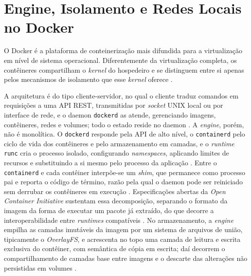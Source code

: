 
\section{Engine, Isolamento e Redes Locais no Docker}

O Docker é a plataforma de conteinerização mais difundida para a virtualização em nível de sistema operacional. Diferentemente da virtualização completa, os contêineres compartilham o \emph{kernel} do hospedeiro e se distinguem entre si apenas pelos mecanismos de isolamento que esse \emph{kernel} oferece \cite{souppaya2017nist}.

A arquitetura é do tipo cliente-servidor, no qual o cliente traduz comandos em requisições a uma API REST, transmitidas por \emph{socket} UNIX local ou por interface de rede, e o daemon \texttt{dockerd} as atende, gerenciando imagens, contêineres, redes e volumes; todo o estado reside no daemon \cite{dockerdocs2026}. A \emph{engine}, porém, não é monolítica. O \texttt{dockerd} responde pela API de alto nível, o \texttt{containerd} pelo ciclo de vida dos contêineres e pelo armazenamento em camadas, e o \emph{runtime} \texttt{runc} cria o processo isolado, configurando \emph{namespaces}, aplicando limites de recursos e substituindo a si mesmo pelo processo da aplicação \cite{rice2020container}. Entre o \texttt{containerd} e cada contêiner interpõe-se um \emph{shim}, que permanece como processo pai e reporta o código de término, razão pela qual o daemon pode ser reiniciado sem derrubar os contêineres em execução \cite{dockerdocs2026}. Especificações abertas da \emph{Open Container Initiative} sustentam essa decomposição, separando o formato da imagem da forma de executar um pacote já extraído, do que decorre a interoperabilidade entre \emph{runtimes} compatíveis \cite{rice2020container}. No armazenamento, a \emph{engine} empilha as camadas imutáveis da imagem por um sistema de arquivos de união, tipicamente o \emph{OverlayFS}, e acrescenta no topo uma camada de leitura e escrita exclusiva do contêiner, com semântica de cópia em escrita; daí decorrem o compartilhamento de camadas base entre imagens e o descarte das alterações não persistidas em volumes \cite{dockerdocs2026}.

